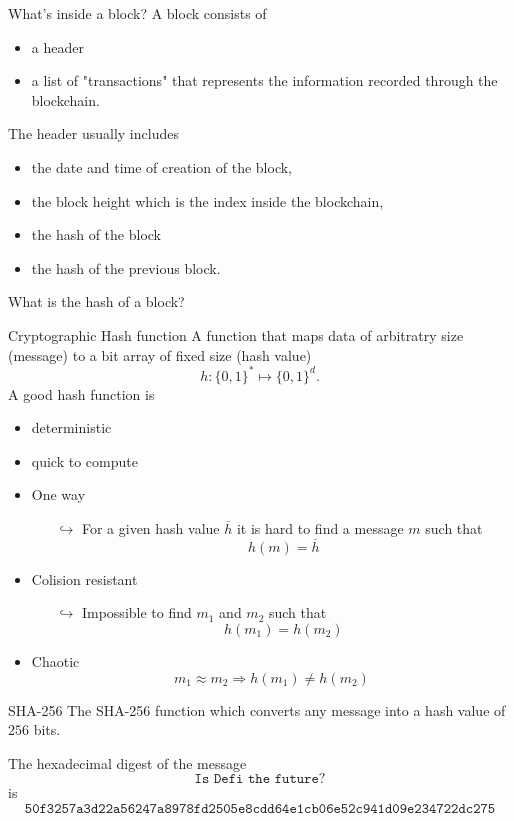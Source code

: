\documentclass{beamer}
\begin{document}
\begin{frame}{What's inside a block?}
A block consists of 
\begin{itemize}
\item a header 
\item a list of "transactions" that represents the information recorded through the blockchain. 
\end{itemize}
The header usually includes 
\begin{itemize}
\item the date and time of creation of the block, 
\item the block height which is the index inside the blockchain, 
\item the hash of the block 
\item the hash of the previous block. 
\end{itemize}
\begin{tcolorbox}[enhanced,drop shadow, title=Question]
What is the hash of a block?
\end{tcolorbox}
\end{frame}
\begin{frame}{Cryptographic Hash function}
\small
A function that maps data of arbitratry size (message) to a bit array of fixed size (hash value)
$$
h:\{0,1\}^\ast\mapsto \{0,1\}^d. 
$$
A good hash function is
\begin{itemize}
\item deterministic
\item quick to compute
\item One way
\begin{itemize}
  \scriptsize
\item[$\hookrightarrow$] For a given hash value $\overline{h}$ it is hard to find a message $m$ such that 
$$
h(m) = \overline{h}
$$
\end{itemize}
\item Colision resistant 
\begin{itemize}
\item[$\hookrightarrow$] Impossible to find $m_1$ and $m_2$ such that 
$$
h(m_1) = h(m_2)
$$
\end{itemize}
\item Chaotic
$$m_1\approx m_2\Rightarrow  h(m_1) \neq h(m_2)$$
\end{itemize}
\end{frame}
\begin{frame}{SHA-256}
The SHA-256 function which converts any message into a hash value of $256$ bits.
\begin{tcolorbox}[enhanced,drop shadow, title=Example]
The hexadecimal digest of the message
$$
\texttt{Is Defi the future?}
$$
is 
\footnotesize
$$
\texttt{50f3257a3d22a56247a8978fd2505e8cdd64e1cb06e52c941d09e234722dc275}
$$
\end{tcolorbox}
\end{frame}
\end{document}
